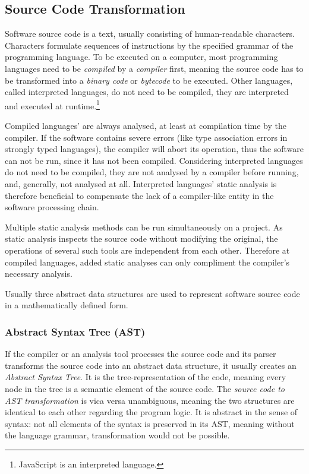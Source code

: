 \subsection{Source Code Transformation}

Software source code is a text, usually consisting of human-readable characters. Characters formulate sequences of instructions by the specified grammar of the programming language. To be executed on a computer, most programming languages need to be \emph{compiled} by a \emph{compiler} first, meaning the source code has to be transformed into a \emph{binary code} or \emph{bytecode} to be executed. Other languages, called interpreted languages, do not need to be compiled, they are interpreted and executed at runtime.\footnote{JavaScript is an interpreted language.}

Compiled languages' are always analysed, at least at compilation time by the compiler. If the software contains severe errors (like type association errors in strongly typed languages), the compiler will abort its operation, thus the software can not be run, since it has not been compiled. Considering interpreted languages do not need to be compiled, they are not analysed by a compiler before running, and, generally, not analysed at all. Interpreted languages' static analysis is therefore beneficial to compensate the lack of a compiler-like entity in the software processing chain.

Multiple static analysis methods can be run simultaneously on a project. As static analysis inspects the source code without modifying the original, the operations of several such tools are independent from each other. Therefore at compiled languages, added static analyses can only compliment the compiler's necessary analysis.

Usually three abstract data structures are used to represent software source code in a mathematically defined form.


\subsubsection{Abstract Syntax Tree (AST)}

If the compiler or an analysis tool processes the source code and its parser transforms the source code into an abstract data structure, it usually creates an \emph{Abstract Syntax Tree}. It is the tree-representation of the code, meaning every node in the tree is a semantic element of the source code. The \emph{source code to AST transformation} is vica versa unambiguous, meaning the two structures are identical to each other regarding the program logic. It is abstract in the sense of syntax: not all elements of the syntax is preserved in its AST, meaning without the language grammar, transformation would not be possible.


